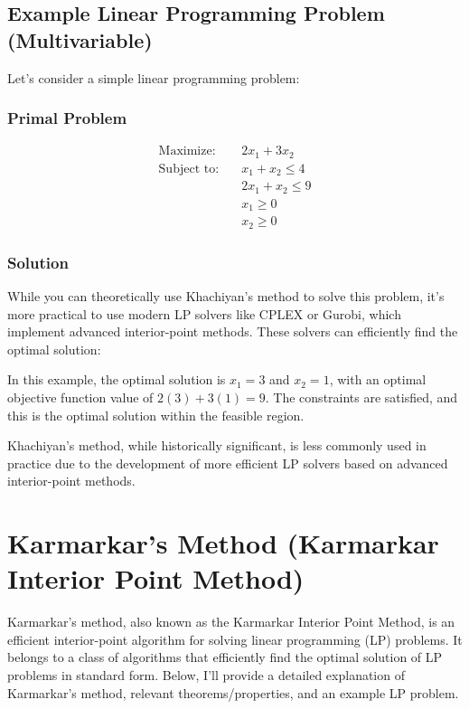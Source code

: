 \documentclass[a4paper]{article}
\begin{document}
\subsection{Example Linear Programming Problem (Multivariable)}

Let's consider a simple linear programming problem:

\subsubsection{Primal Problem}
\begin{align*}
\text{Maximize:} \quad & 2x_1 + 3x_2 \\
\text{Subject to:} \quad & x_1 + x_2 \leq 4 \\
& 2x_1 + x_2 \leq 9 \\
& x_1 \geq 0 \\
& x_2 \geq 0
\end{align*}

\subsubsection{Solution}

While you can theoretically use Khachiyan's method to solve this problem, it's more practical to use modern LP solvers like CPLEX or Gurobi, which implement advanced interior-point methods. These solvers can efficiently find the optimal solution:

In this example, the optimal solution is \(x_1 = 3\) and \(x_2 = 1\), with an optimal objective function value of \(2(3) + 3(1) = 9\). The constraints are satisfied, and this is the optimal solution within the feasible region.

Khachiyan's method, while historically significant, is less commonly used in practice due to the development of more efficient LP solvers based on advanced interior-point methods.

\section{Karmarkar's Method (Karmarkar Interior Point Method)}

Karmarkar's method, also known as the Karmarkar Interior Point Method, is an efficient interior-point algorithm for solving linear programming (LP) problems. It belongs to a class of algorithms that efficiently find the optimal solution of LP problems in standard form. Below, I'll provide a detailed explanation of Karmarkar's method, relevant theorems/properties, and an example LP problem.
\end{document}
